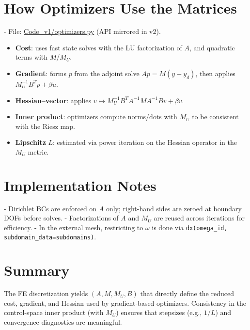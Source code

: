\documentclass[11pt,a4paper]{article}
\begin{document}
\section{How Optimizers Use the Matrices}
- File: \href{run:../Code_v1/optimizers.py}{Code\_v1/optimizers.py} (API mirrored in v2).
  \begin{itemize}
    \item \textbf{Cost}: uses fast state solves with the LU factorization of $A$, and quadratic terms with $M$/$M_U$.
    \item \textbf{Gradient}: forms $p$ from the adjoint solve $A p = M(y-y_d)$, then applies $M_U^{-1}B^T p + \beta u$.
    \item \textbf{Hessian--vector}: applies $v\mapsto M_U^{-1} B^T A^{-1} M A^{-1} B v + \beta v$.
    \item \textbf{Inner product}: optimizers compute norms/dots with $M_U$ to be consistent with the Riesz map.
    \item \textbf{Lipschitz} $L$: estimated via power iteration on the Hessian operator in the $M_U$ metric.
  \end{itemize}

\section{Implementation Notes}
- Dirichlet BCs are enforced on $A$ only; right-hand sides are zeroed at boundary DOFs before solves.
- Factorizations of $A$ and $M_U$ are reused across iterations for efficiency.
- In the external mesh, restricting to $\omega$ is done via \texttt{dx(omega\_id, subdomain\_data=subdomains)}.

\section{Summary}
The FE discretization yields $(A, M, M_U, B)$ that directly define the reduced cost, gradient, and Hessian used by gradient-based optimizers. Consistency in the control-space inner product (with $M_U$) ensures that stepsizes (e.g., $1/L$) and convergence diagnostics are meaningful.
\end{document}
